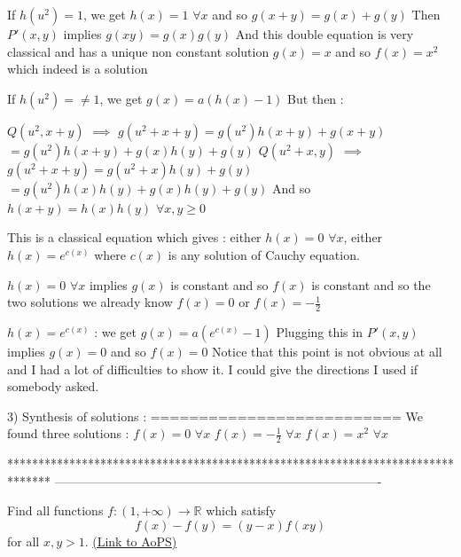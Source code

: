 \begin{solution}
If $h(u^2)=1$, we get $h(x)=1$ $\forall x$ and so $g(x+y)=g(x)+g(y)$
Then $P'(x,y)$ implies $g(xy)=g(x)g(y)$
And this double equation is very classical and has a unique non constant solution $g(x)=x$ and so $f(x)=x^2$ which indeed is a solution

If $h(u^2)=\ne 1$, we get $g(x)=a(h(x)-1)$
But then :

$Q(u^2,x+y)$ $\implies$ $g(u^2+x+y)=g(u^2)h(x+y)+g(x+y)$ $=g(u^2)h(x+y)+g(x)h(y)+g(y)$
$Q(u^2+x,y)$ $\implies$ $g(u^2+x+y)=g(u^2+x)h(y)+g(y)$ $=g(u^2)h(x)h(y)+g(x)h(y)+g(y)$
And so $h(x+y)=h(x)h(y)$ $\forall x,y\ge 0$

This is a classical equation which gives : either $h(x)=0$ $\forall x$, either $h(x)=e^{c(x)}$ where $c(x)$ is any solution of Cauchy equation.

$h(x)=0$ $\forall x$ implies $g(x)$ is constant and so $f(x)$ is constant and so the two solutions we already know $f(x)=0$ or $f(x)=-\frac 12$

$h(x)=e^{c(x)}$ : we get $g(x)=a(e^{c(x)}-1)$
Plugging this in $P'(x,y)$ implies $g(x)=0$ and so $f(x)=0$
Notice that this point is not obvious at all and I had a lot of difficulties to show it. I could give the directions I used  if somebody asked.

3) Synthesis of solutions :
==========================
We found three solutions :
$f(x)=0$ $\forall x$
$f(x)=-\frac 12$ $\forall x$
$f(x)=x^2$ $\forall x$
\end{solution}
*******************************************************************************
-------------------------------------------------------------------------------

\begin{problem}
	Find all functions $f:(1, +\infty ) \to \mathbb R$ which satisfy
\[f(x)-f(y)=(y-x)f(xy)\] for all $x,y >1 $.
	\flushright \href{https://artofproblemsolving.com/community/c6h384559}{(Link to AoPS)}
\end{problem}



